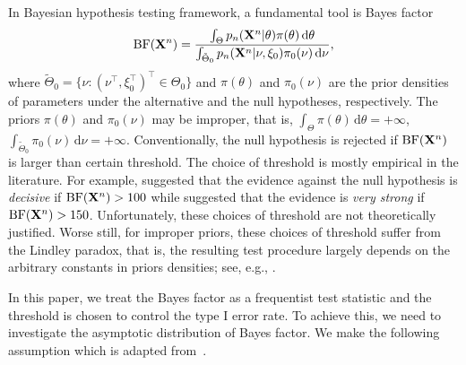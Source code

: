 \documentclass[11pt]{article}
\theoremstyle{plain}
\theoremstyle{definition}
\theoremstyle{remark}
\begin{document}
In Bayesian hypothesis testing framework, a fundamental tool is Bayes factor
\begin{equation*}
    \text{BF}(\mathbf{X}^{n})=
    \frac{\int_{\Theta} p_n(\mathbf{X}^{n}|\theta)\pi(\theta)\, \mathrm d\theta}{\int_{\tilde{\Theta}_0}p_n(\mathbf{X}^{n}|\nu,\xi_0)\pi_0(\nu)\, \mathrm d\nu},
\end{equation*}
where $\tilde{\Theta}_0=\{\nu: (\nu^\top ,\xi_0^\top )^\top \in \Theta_0\}$ and $\pi(\theta)$ and $\pi_0(\nu)$ are the prior densities of parameters under the alternative and the  null hypotheses, respectively.
The priors $\pi(\theta)$ and $\pi_0 (\nu)$ may be improper, that is, $\int_{\Theta} \pi(\theta) \, \mathrm d \theta = + \infty$, $\int_{\tilde \Theta_0} \pi_0 (\nu) \, \mathrm d \nu  = + \infty$.
Conventionally, the null hypothesis is rejected if $\text{BF}(\mathbf{X}^n)$ is larger than certain threshold.
The choice of threshold is mostly empirical in the literature.
For example, \cite{Jeffreys1961} suggested that the evidence against the null hypothesis is \emph{decisive} if $\text{BF}(\mathbf{X}^n)>100$ while \cite{Robert1995Bayes} suggested that the evidence is \emph{very strong} if $\text{BF}(\mathbf{X}^n) > 150$.
Unfortunately, these choices of threshold  are not theoretically justified.
Worse still, for improper priors, these choices of threshold suffer from the Lindley paradox, that is, the resulting test procedure largely depends on the arbitrary constants in priors densities; see, e.g., \cite{Shafer1982}.

In this paper, we treat the Bayes factor as a frequentist test statistic and the threshold is chosen to control the type I error rate.
To achieve this, we need to investigate the asymptotic distribution of Bayes factor.
We make the following assumption which is adapted from~\cite{Kleijn2012The}.
\end{document}
